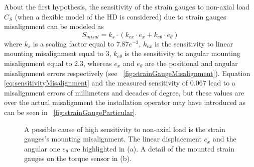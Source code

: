 About the first hypothesis, the sensitivity of the strain gauges to non-axial load $C_S$ (when a flexible model of the HD is considered) due to strain gauges misalignment can be modeled as
\begin{equation}
S_{misal}= k_s \cdot (k_{ex} \cdot e_x + k_{e\theta} \cdot e_{\theta})
\label{eq:sensitivityMisalignment}
\end{equation}
where $k_s$ is a scaling factor equal to $7.87e^{-3}$, $k_{ex}$ is the sensitivity to linear mounting misalignment  equal to $3$, $k_{e\theta}$ is the sensitivity to angular mounting misalignment equal to $2.3$, whereas $e_x$ and $e_{\theta}$ are the positional and angular misalignment errors respectively (see \figurename \ \ref{fig:strainGaugeMisalignment}). Equation \eqref{eq:sensitivityMisalignment} and the measured sensitivity of 0.067 lead to a misalignment errors of millimeters and decades of degree, but these values are over the actual misalignment the installation operator may have introduced as can be seen in \figurename \ \ref{fig:strainGaugeParticular}.
%
\begin{figure}[]
	\centering
	\caption{A possible cause of high sensitivity to non-axial load is the strain gauges's mounting misalignment. The linear displacement $e_x$ and the angular one $e_{\theta}$ are highlighted in (a). A detail of the mounted strain gauges on the torque sensor in (b).} 
\end{figure}


